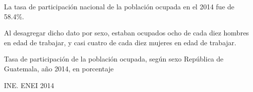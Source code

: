 
%
{%
	La tasa de participación nacional de la población ocupada en el 2014 fue de 58.4\%.
	
	Al desagregar dicho dato por sexo, estaban ocupados ocho de cada diez hombres en edad de trabajar, y casi cuatro de cada diez mujeres en edad de trabajar.}%
{%
	Tasa de participación de la población ocupada, según sexo} %
{%
	República de Guatemala, año 2014, en porcentaje} %
{%
	\begin{tikzpicture}[x=1pt,y=1pt]    \end{tikzpicture}}%
{%
	INE. ENEI 2014} %

